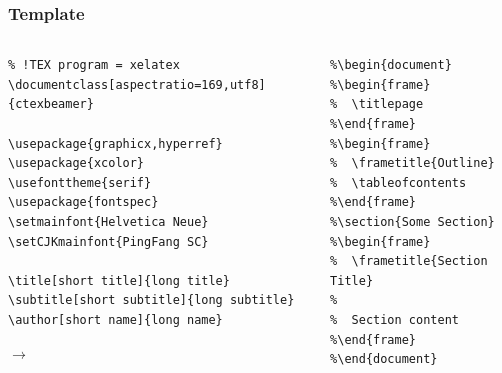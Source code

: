 \documentclass[aspectratio=169,utf8]{ctexbeamer}
\begin{document}
\begin{frame}[fragile]
  \frametitle{Template}

  \begin{columns}[t]
    \begin{column}{.5\textwidth}
      \scriptsize
\begin{verbatim}
% !TEX program = xelatex
\documentclass[aspectratio=169,utf8]{ctexbeamer}

\usepackage{graphicx,hyperref}
\usepackage{xcolor}
\usefonttheme{serif}
\usepackage{fontspec}
\setmainfont{Helvetica Neue}
\setCJKmainfont{PingFang SC}

\title[short title]{long title}
\subtitle[short subtitle]{long subtitle}
\author[short name]{long name}
\end{verbatim}

      $\longrightarrow$
      
    \end{column}

    \begin{column}{.35\textwidth}
      \scriptsize
\begin{verbatim}
%\begin{document}
%\begin{frame}
%  \titlepage
%\end{frame}
%\begin{frame}
%  \frametitle{Outline}
%  \tableofcontents
%\end{frame}
%\section{Some Section}
%\begin{frame}
%  \frametitle{Section Title}
%
%  Section content
%\end{frame}
%\end{document}
\end{verbatim}
      
    \end{column}
    
  \end{columns}

\end{frame}
\end{document}
